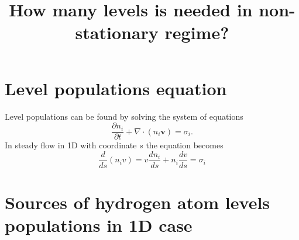 \documentclass{article}
\title{How many levels is needed in non-stationary regime?}
\begin{document}
\maketitle


\section{Level populations equation}

Level populations can be found by solving the system of equations
\begin{equation}
    \frac{\partial n_i}{\partial t} + \nabla\cdot(n_i \mathbf{v}) = \sigma_i.
\end{equation}
In steady flow in 1D with coordinate \(s\) the equation  becomes
\begin{equation}\label{eq:1d-full}
    \frac{d}{ds}\left(n_i v\right) = v\frac{dn_i}{ds} + n_i\frac{dv}{ds} = \sigma_i
\end{equation}

\section{Sources of hydrogen atom levels populations in 1D case}
\end{document}
